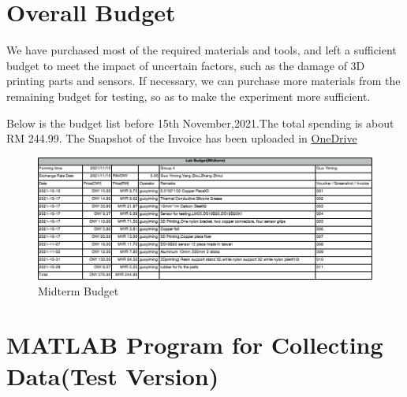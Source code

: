 \documentclass[12pt]{article}
\numberwithin{equation}{section}
\begin{document}
\section{Overall Budget}


We have purchased most of the required materials and tools, and left a sufficient budget to meet the impact of uncertain factors, such as the damage of 3D printing parts and sensors. If necessary, we can purchase more materials from the remaining budget for testing, so as to make the experiment more sufficient.


Below is the budget list before 15th November,2021.The total spending is about RM 244.99. The Snapshot of the Invoice has been uploaded in \href{https://xmueducn-my.sharepoint.com/:f:/g/personal/phy2009481_xmu_edu_my/EvIBnq7mNU1EnrVq51AzZlMBAzm7wgJzyvNK9EDlRcBWUg?e=X8belq}{OneDrive} 


\begin{figure}[H] %
\centering %
\includegraphics[width=1\textwidth]{MidtermBudget.png} %
\caption{Midterm Budget} %
\end{figure} 








\appendix
      \section{MATLAB Program for Collecting Data(Test Version)}
\end{document}
